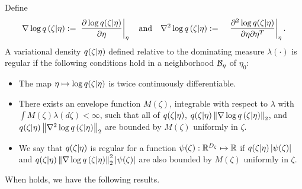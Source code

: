 
\begin{assu}
%
Define
%
\begin{align*}
%
\lqgrad{\zeta \vert \eta} :={}&
    \fracat{\partial \log \q(\zeta \vert \eta)}{\partial \eta}{\eta}
    \mathtxt{and}
%
\lqhess{\zeta \vert \eta} :={}&
    \fracat{\partial^2 \log \q(\zeta \vert \eta)}
           {\partial \eta \partial \eta^T}{\eta}.
%
\end{align*}
%
A variational density $q(\zeta \vert \eta)$ defined relative to the dominating
measure $\lambda(\cdot)$ is regular if the following conditions hold in a
neighborhood $\mathcal{B}_\eta$ of $\eta_0$:
%
\begin{itemize}
%
\item  The map $\eta \mapsto \log q(\zeta \vert \eta)$ is twice continuously
differentiable.
%
\item  There exists an envelope function $M(\zeta)$, integrable with respect to
$\lambda$ with $\int M(\zeta) \lambda(d\zeta) < \infty$, such that
all of $q(\zeta \vert \eta)$, $q(\zeta \vert \eta) \left\Vert{\nabla \log q}\left(\zeta \vert \eta\right)\right\Vert_2$,
and $q(\zeta \vert \eta) \left\Vert{\nabla^2 \log q}\left(\zeta \vert \eta\right)\right\Vert_2$ are
bounded by $M(\zeta)$ uniformly in $\zeta$.
%
\item We say that $q(\zeta \vert \eta)$ is regular for a function $\psi(\zeta):
\mathbb{R}^{D_{\zeta}} \mapsto \mathbb{R}$ if $q(\zeta \vert \eta)
\left|\psi(\zeta)\right|$ and $q(\zeta \vert \eta) \left\Vert{\nabla \log q}\left(\zeta \vert
\eta\right)\right\Vert_2^2 \left|\psi(\zeta)\right|$ are also bounded by $M(\zeta)$ uniformly in
$\zeta$.
%
\end{itemize}
%
%
\end{assu}
%
%
When  holds, we have the following results.
%

